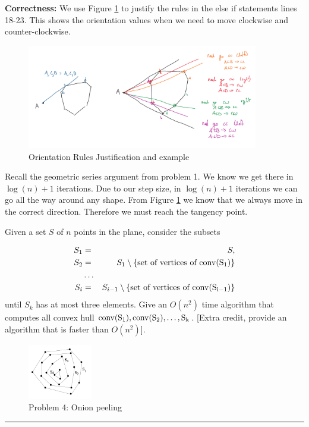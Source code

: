 \documentclass[11pt]{article}
\newcommand{\conv}[1]{\rm{conv}(#1)}
\begin{document}
\textbf{Correctness:} 
We use Figure \ref{fig:orientation} to justify the rules in the else if statements lines 18-23.
This shows the orientation values when we need to move clockwise and counter-clockwise.
\begin{figure}[h]
    \centering
    \includegraphics[width=0.9\textwidth]{prob_3_correctness.png}
    \caption{Orientation Rules Justification and example}
    \label{fig:orientation}
\end{figure}

Recall the geometric series argument from problem 1.
We know we get there in $\log(n) + 1$ iterations. Due to our step size, in $\log(n) + 1$ iterations
we can go all the way around any shape. From Figure \ref{fig:orientation} we know that we always move in the correct direction.
Therefore we must reach the tangency point.


Given a set $S$ of $n$ points in the plane, consider the subsets

\begin{eqnarray*}
	S_1 &=& S, \\
	S_2 &=& S_1 \setminus \{ \text{set of vertices of } \conv{S_1} \} \\
		&\ldots& \\
	S_i &=& S_{i-1} \setminus \{ \text{set of vertices of } \conv{S_{i-1}} \}
\end{eqnarray*}
%
until $S_k$ has at most three elements.  Give an $O(n^2)$ time algorithm that
computes all convex hull $\conv{S_1}, \conv{S_2}, \ldots, S_k$.  [Extra credit,
provide an algorithm that is faster than $O(n^2)$].

\begin{figure}[h]
    \centering
    \includegraphics[width=0.25\textwidth]{onions}
    \caption{Problem 4: Onion peeling}
\end{figure}
\hrule
\end{document}

